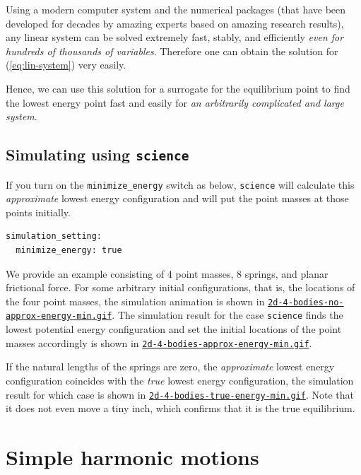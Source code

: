 \documentclass{article}
\begin{document}
Using a modern computer system and the numerical packages (that have been developed for decades by amazing experts based on amazing research results),
any linear system can be solved extremely fast, stably, and efficiently
\emph{even for hundreds of thousands of variables}.
Therefore one can obtain the solution for (\ref{eq:lin-system}) very easily.

Hence, we can use this solution for a surrogate for the equilibrium point
to find the lowest energy point fast and easily
for \emph{an arbitrarily complicated and large system}.

\subsection{Simulating using {\tt science}}

If you turn on the \verb+minimize_energy+ switch as below,
{\tt science} will calculate this \emph{approximate} lowest energy configuration
and will put the point masses at those points initially.

\begin{verbatim}
simulation_setting:
  minimize_energy: true
\end{verbatim}

We provide an example consisting of 4 point masses, 8 springs, and planar frictional force.
For some arbitrary initial configurations, that is, the locations of the four point masses,
the simulation animation is shown in
{\tt \href{https://github.com/sungheeyun/science/blob/main/animations/2d-4-bodies-no-approx-energy-min.gif}{2d-4-bodies-no-approx-energy-min.gif}}.
The simulation result for the case {\tt science} finds the lowest potential energy configuration
and set the initial locations of the point masses accordingly
is shown in
{\tt \href{https://github.com/sungheeyun/science/blob/main/animations/2d-4-bodies-approx-energy-min.gif}{2d-4-bodies-approx-energy-min.gif}}.

If the natural lengths of the springs are zero,
the \emph{approximate} lowest energy configuration coincides with the \emph{true} lowest energy configuration,
the simulation result for which case is shown in
{\tt \href{https://github.com/sungheeyun/science/blob/main/animations/2d-4-bodies-true-energy-min.gif}{2d-4-bodies-true-energy-min.gif}}.
Note that it does not even move a tiny inch, which confirms that it is the true equilibrium.



\section{Simple harmonic motions}
\label{section:simple-harmonic-motions}
\end{document}
